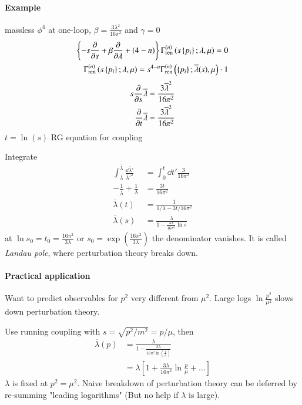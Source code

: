 \paragraph{Example} massless $\phi^4$ at one-loop, $\beta = \frac{3\lambda^2}{16 \pi^2}$ and $\gamma=0$
\begin{align*}
   \left\{ -s \pdv{s} + \beta \pdv{\lambda} + (4-n) \right\} \Gamma_\text{ren}^{(n)} \left( s \left\{ p_i \right\}; \lambda, \mu \right) = 0\\
   \Gamma_\text{ren}^{(n)} \left(  s \left\{ p_i \right\}; \lambda, \mu \right) = s^{4-n} \Gamma_\text{ren}^{(n)} \left( \left\{ p_i \right\}; \overline{\lambda}(s), \mu \right) \cdot 1
\end{align*}
\begin{align*}
   s \pdv{s} \overline{\lambda} = \frac{3 \overline{\lambda}^2}{ 16 \pi^2 }\\
   \pdv{t} \overline{\lambda} = \frac{3 \overline{\lambda}^2}{16 \pi^2}
\end{align*}
$t = \ln(s)$ RG equation for coupling

Integrate 
\begin{align*}
   \int_{\lambda}^{\overline{\lambda}} \frac{\dd{\overline{\lambda}'}}{\overline{\lambda}'^2} &= \int_0^t \dd{t'} \frac{3}{16 \pi^2} \\
   - \frac{1}{\overline{\lambda}} + \frac{1}{\lambda} &= \frac{3t}{16 \pi^2} \\
   \overline{\lambda}(t) &= \frac{1}{1/\lambda - 3t / 16\pi^2} \\
   \overline{\lambda}(s) &= \frac{\lambda}{1-\frac{3\lambda}{16\pi^2} \ln s}
\end{align*}
at $\ln s_0 = t_0 = \frac{16\pi^2}{3\lambda}$ or $s_0 = \exp(\frac{16\pi^2}{3\lambda})$ the denominator vanishes. It is called \textit{Landau pole}, where perturbation theory breaks down.

\paragraph{Practical application}
Want to predict observables for $p^2$ very different from $\mu^2$. Large logs $\ln \frac{p^2}{\mu^2}$ slows down perturbation theory.

Use running coupling with $s = \sqrt{p^2 / m^2} = p / \mu$, then
\begin{align*}
   \overline{\lambda}(p) &= \frac{\lambda}{1 - \frac{3\lambda}{16\pi^2 \ln(\frac{p}{\mu})}} \\
                         &= \lambda \left[ 1 + \frac{3\lambda}{16 \pi^2} \ln \frac{p}{\mu} + \dots \right]
\end{align*}
$\lambda$ is fixed at $p^2 = \mu^2$. Naive breakdown of perturbation theory can be deferred by re-summing "leading logarithms" (But no help if $\lambda$ is large).
